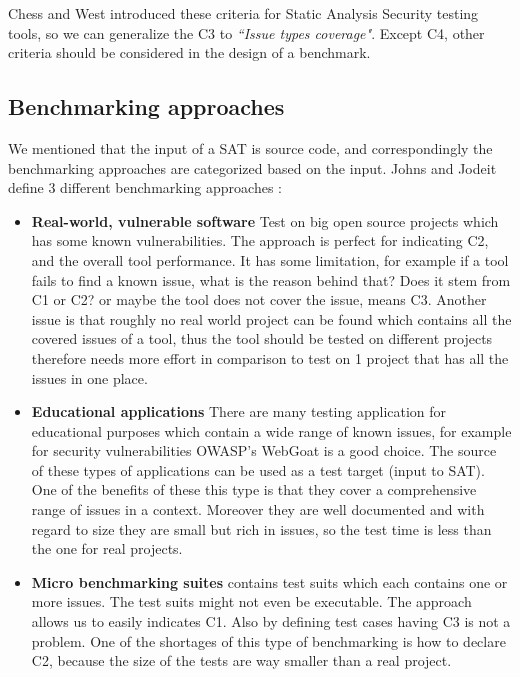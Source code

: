 \documentclass[authoryear,preprint]{sigplanconf}
\begin{document}
Chess and West introduced these criteria for Static Analysis Security testing tools, so we can generalize the C3 to \textit{``Issue types coverage"}. Except C4, other criteria should be considered in the design of a benchmark. 

\subsection{Benchmarking approaches}
We mentioned that the input of a SAT is source code, and correspondingly the benchmarking approaches are categorized based on the input. Johns and Jodeit define 3 different benchmarking approaches \cite{Scanstud}: 

\begin{itemize}
	\item \textbf{Real-world, vulnerable software} Test on big open source projects which has some known vulnerabilities. The approach is perfect for indicating C2, and the overall tool performance. It has some limitation, for example if a tool fails to find a known issue, what is the reason behind that? Does it stem from C1 or C2? or maybe the tool does not cover the issue, means C3. Another issue is that roughly no real world project can be found which contains all the covered issues of a tool, thus the tool should be tested on different projects therefore needs more effort in comparison to test on 1 project that has all the issues in one place.
	
	\item \textbf{Educational applications} There are many testing application for educational purposes which contain a wide range of known issues, for example for security vulnerabilities OWASP’s WebGoat \cite{owasp} is a good choice. The source of these types of applications can be used as a test target (input to SAT). One of the benefits of these this type is that they cover a comprehensive range of issues in a context. Moreover they are well documented and with regard to size they are small but rich in issues, so the test time is less than the one for real projects. 
	
	\item \textbf{Micro benchmarking suites} contains test suits which each contains one or more issues. The test suits might not even be executable. The approach allows us to easily indicates C1. Also by defining test cases having C3 is not a problem. One of the shortages of this type of benchmarking is how to declare C2, because the size of the tests are way smaller than a real project. 
\end{itemize}
\end{document}
